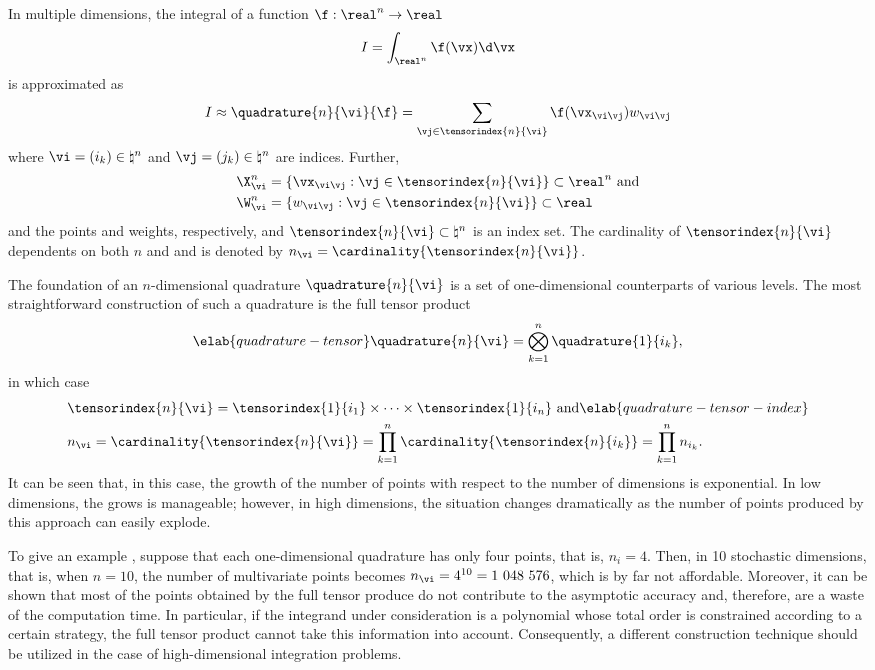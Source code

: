 In multiple dimensions, the integral of a function $\f: \real^n \to \real$
\[
  I = \int_{\real^n} \f(\vx) \d \vx
\]
is approximated as
\[
  I \approx \quadrature{n}{\vi}{\f}
  = \sum_{\vj \in \tensorindex{n}{\vi}} \f(\vx_{\vi \vj}) w_{\vi \vj}
\]
where $\vi = (i_k) \in \natural^n$ and $\vj = (j_k) \in \natural^n$ are indices.
Further,
\begin{align*}
  & \X^n_{\vi} = \{ \vx_{\vi \vj}: \vj \in \tensorindex{n}{\vi} \} \subset \real^n \text{ and} \\
  & \W^n_{\vi} = \{ w_{\vi \vj}: \vj \in \tensorindex{n}{\vi} \} \subset \real
\end{align*}
and the points and weights, respectively, and $\tensorindex{n}{\vi} \subset
\natural^n$ is an index set. The cardinality of $\tensorindex{n}{\vi}$
dependents on both $n$ and \vi and is denoted by $n_{\vi} =
\cardinality{\tensorindex{n}{\vi}}$.

The foundation of an $n$-dimensional quadrature $\quadrature{n}{\vi}$ is a set
of one-dimensional counterparts of various levels. The most straightforward
construction of such a quadrature is the full tensor product
\begin{equation} \elab{quadrature-tensor}
  \quadrature{n}{\vi} = \bigotimes_{k = 1}^n \quadrature{1}{i_k},
\end{equation}
in which case
\begin{align}
  & \tensorindex{n}{\vi}
  = \tensorindex{1}{i_1} \times \cdots \times \tensorindex{1}{i_n} \text{ and} \elab{quadrature-tensor-index} \\
  & n_{\vi}
  = \cardinality{\tensorindex{n}{\vi}}
  = \prod_{k = 1}^n \cardinality{\tensorindex{n}{i_k}}
  = \prod_{k = 1}^n n_{i_k}. \nonumber
\end{align}
It can be seen that, in this case, the growth of the number of points with
respect to the number of dimensions is exponential. In low dimensions, the grows
is manageable; however, in high dimensions, the situation changes dramatically
as the number of points produced by this approach can easily explode.

To give an example \cite{heiss2008}, suppose that each one-dimensional
quadrature has only four points, that is, $n_i = 4$. Then, in 10 stochastic
dimensions, that is, when $n = 10$, the number of multivariate points becomes
$n_{\vi} = 4^{10} = 1~048~576$, which is by far not affordable. Moreover, it can
be shown that most of the points obtained by the full tensor produce do not
contribute to the asymptotic accuracy and, therefore, are a waste of the
computation time. In particular, if the integrand under consideration is a
polynomial whose total order is constrained according to a certain strategy, the
full tensor product cannot take this information into account. Consequently, a
different construction technique should be utilized in the case of
high-dimensional integration problems.

